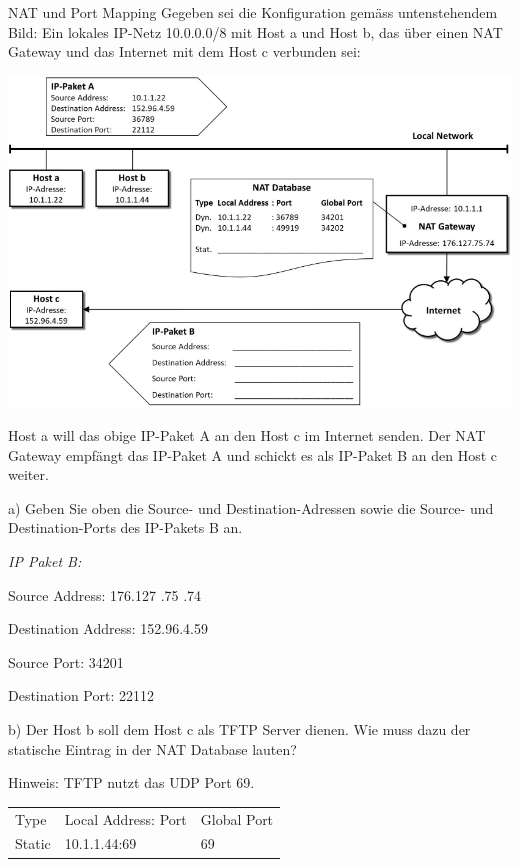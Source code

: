 \begin{example2}{NAT und Port Mapping}
Gegeben sei die Konfiguration gemäss untenstehendem Bild: Ein lokales IP-Netz 10.0.0.0/8 mit Host a und Host b, das über einen NAT Gateway und das Internet mit dem Host c verbunden sei:

\includegraphics[width=1\linewidth]{images/nat_bsp.png}

Host a will das obige IP-Paket A an den Host c im Internet senden. Der NAT Gateway empfängt das IP-Paket A und schickt es als IP-Paket B an den Host c weiter.

a) Geben Sie oben die Source- und Destination-Adressen sowie die Source- und Destination-Ports des IP-Pakets B an.

\emph{IP Paket B:}

Source Address: 176.127 .75 .74

Destination Address: 152.96.4.59

Source Port: 34201

Destination Port: 22112

\vspace{1mm}

b) Der Host b soll dem Host c als TFTP Server dienen. Wie muss dazu der statische Eintrag in der NAT Database lauten? 

Hinweis: TFTP nutzt das UDP Port 69.

\vspace{1mm}

\begin{tabular}{lll} 
Type & Local Address: Port & Global Port \\
Static & 10.1.1.44:69 & 69
\end{tabular}
\end{example2}
